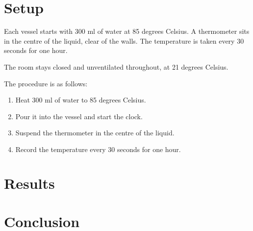 \documentclass[a4paper,11pt]{article}
\begin{document}
%
%

%
%


%
%

\section{Setup}\label{sec:setup}

Each vessel starts with 300 ml of water at 85 degrees Celsius.
A thermometer sits in the centre of the liquid, clear of the walls.
The temperature is taken every 30 seconds for one hour.

The room stays closed and unventilated throughout, at 21 degrees Celsius.

The procedure is as follows:

\begin{enumerate}
    \item Heat 300 ml of water to 85 degrees Celsius.
    \item Pour it into the vessel and start the clock.
    \item Suspend the thermometer in the centre of the liquid.
    \item Record the temperature every 30 seconds for one hour.
\end{enumerate}

\section{Results}\label{sec:results}

\section{Conclusion}\label{sec:conclusion}
\end{document}
